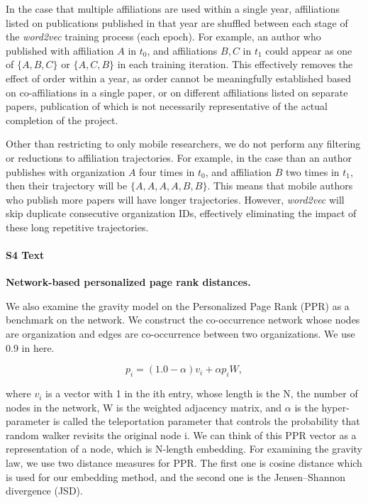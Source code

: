 \documentclass[12pt]{article} %
\begin{document}
In the case that multiple affiliations are used within a single year, affiliations listed on publications published in that year are shuffled between each stage of the \textit{word2vec} training process (each epoch). 
For example, an author who published with affiliation $A$ in $t_{0}$, and affiliations $B, C$ in $t_{1}$ could appear as one of $\{A, B, C\}$ or $\{A, C, B\}$ in each training iteration. 
This effectively removes the effect of order within a year, as order cannot be meaningfully established based on co-affiliations in a single paper, or on different affiliations listed on separate papers, publication of which is not necessarily representative of the actual completion of the project. 

Other than restricting to only mobile researchers, we do not perform any filtering or reductions to affiliation trajectories.
For example, in the case than an author publishes with organization $A$ four times in $t_{0}$, and affiliation $B$ two times in $t_{1}$, then their trajectory will be $\{A, A, A, A, B, B\}$. 
This means that mobile authors who publish more papers will have longer trajectories.
However, \textit{word2vec} will skip duplicate consecutive organization IDs, effectively eliminating the impact of these long repetitive trajectories. 



%
\paragraph*{S4 Text}
\label{si:text:ppr_dist}
{\bf Network-based personalized page rank distances.}


We also examine the gravity model on the Personalized Page Rank (PPR)\autocite{jeh2003scaling} as a benchmark on the network. We construct the co-occurrence network whose nodes are organization and edges are co-occurrence between two organizations. We use 0.9 in here.

\begin{equation}
	\label{eq:ppr}
	p_i = (1.0 - \alpha) v_i + \alpha p_i W,
\end{equation}

where $v_i$ is a vector with 1 in the ith entry, whose length is the N, the number of nodes in the network, W is the weighted adjacency matrix, and $\alpha$ is the hyper-parameter is called the teleportation parameter that controls the probability that random walker revisits the original node i. We can think of this PPR vector as a representation of a node, which is N-length embedding. For examining the gravity law, we use two distance measures for PPR. The first one is cosine distance which is used for our embedding method, and the second one is the Jensen–Shannon divergence (JSD).
\end{document}
